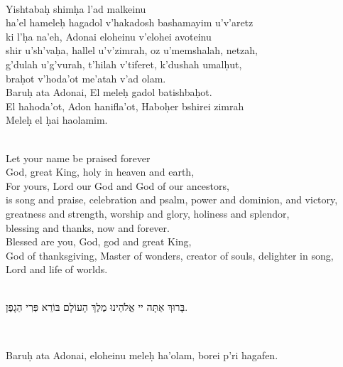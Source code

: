 \documentclass[a4paper,12pt,openany]{memoir}
\newcommand{\HgInst}[1]{{\noindent\sffamily{\bfseries{#1}}}}
\newenvironment{HgEnglish}{\strut\\\noindent}{\vspace{1em}}
\newenvironment{HgTranslit}{\strut\\\noindent\begin{itshape}}{\end{itshape}\vspace{1em}}
\newenvironment{HgHebrew}{\begin{hebrew}\strut\\\noindent\Large}{\end{hebrew}}
\begin{document}
\begin{HgTranslit}
  Yishtaba\d{h} shim\d{h}a l'ad malkeinu \\
  ha'el hamele\d{h} hagadol v'hakadosh bashamayim u'v'aretz \\
  ki l'\d{h}a na'eh, Adonai eloheinu v'elohei avoteinu \\
  shir u'sh'va\d{h}a, hallel u'v'zimrah, oz u'memshalah, netzah, \\
  g'dulah u'g'vurah, t'hilah v'tiferet, k'dushah umal\d{h}ut, \\
  bra\d{h}ot v'hoda'ot me'atah v'ad olam. \\
  Baru\d{h} ata Adonai, El mele\d{h} gadol batishba\d{h}ot. \\
  El hahoda'ot, Adon hanifla'ot, Habo\d{h}er bshirei zimrah \\
  Mele\d{h} el \d{h}ai haolamim.
\end{HgTranslit}

\begin{HgEnglish}
  Let your name be praised forever \\
  God, great King, holy in heaven and earth, \\
  For yours, Lord our God and God of our ancestors, \\
  is song and praise, celebration and psalm, power and dominion, and victory, \\
  greatness and strength, worship and glory, holiness and splendor, \\
  blessing and thanks, now and forever. \\
  Blessed are you, God, god and great King, \\
  God of thanksgiving, Master of wonders, creator of souls, delighter in song, \\
  Lord and life of worlds.
\end{HgEnglish}

\HgInst{One more time:}
\vspace{-1em}

\begin{HgHebrew} 
  בָּרוּךְ אַתָּה יי אֱלֹהֵינוּ מֶלֶךְ הָעוֹלָם בּוֹרֵא פְּרִי הַגָפֶן.
\end{HgHebrew}

\begin{HgTranslit}
  Baru\d{h} ata Adonai, eloheinu mele\d{h} ha'olam,
  borei p'ri hagafen.
\end{HgTranslit}
\vspace{-2em}
\end{document}
